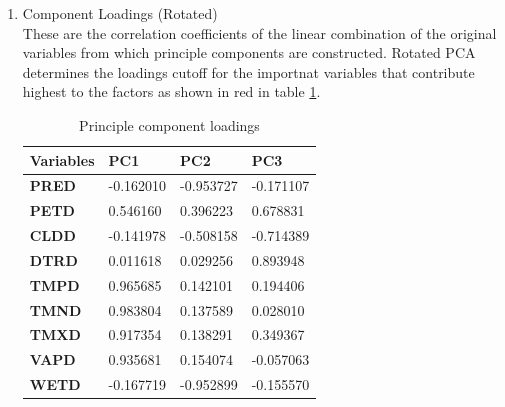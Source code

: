 \documentclass[12pt,a4paper]{article}
\begin{document}
\begin{enumerate}[label=\roman*)]
\item Component Loadings (Rotated)\\
These are the correlation coefficients of the linear combination of the original variables from which principle components are constructed.
Rotated PCA determines the loadings cutoff for the importnat variables that contribute highest to the factors as shown in red in table \ref{load}.
\begin{table}[h]
	\centering
	\begin{tabular}{|l|l|l|l|}
		\hline
		\textbf{Variables} & \textbf{PC1}                    & \textbf{PC2}                     & \textbf{PC3}                     \\ \hline
		\textbf{PRED}      & -0.162010                       & {\color[HTML]{FE0000} -0.953727} & -0.171107                        \\ \hline
		\textbf{PETD}      & 0.546160                        & 0.396223                         & 0.678831                         \\ \hline
		\textbf{CLDD}      & -0.141978                       & -0.508158                        & {\color[HTML]{FE0000} -0.714389} \\ \hline
		\textbf{DTRD}      & 0.011618                        & 0.029256                         & {\color[HTML]{FE0000} 0.893948}  \\ \hline
		\textbf{TMPD}      & {\color[HTML]{FE0000} 0.965685} & 0.142101                         & 0.194406                         \\ \hline
		\textbf{TMND}      & {\color[HTML]{FE0000} 0.983804} & 0.137589                         & 0.028010                         \\ \hline
		\textbf{TMXD}      & {\color[HTML]{FE0000} 0.917354} & 0.138291                         & 0.349367                         \\ \hline
		\textbf{VAPD}      & {\color[HTML]{FE0000} 0.935681} & 0.154074                         & -0.057063                        \\ \hline
		\textbf{WETD}      & -0.167719                       & {\color[HTML]{FE0000} -0.952899} & -0.155570                        \\ \hline
	\end{tabular}
\caption{Principle component loadings}
\label{load}
\end{table}


\end{enumerate}
\end{document}
